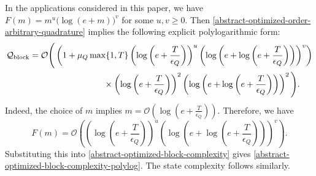 \documentclass[10pt,reqno]{article}
\numberwithin{equation}{section}
\theoremstyle{plain}
\theoremstyle{definition}
\begin{document}
In the applications considered in this paper, we have \(F(m)=m^u\bigl(\log(e+m)\bigr)^v\) for some \(u,v\geq0\). Then \cref{abstract-optimized-order-arbitrary-quadrature} implies the following explicit polylogarithmic form:
\begin{align}\label{abstract-optimized-block-complexity-polylog}
\mathcal Q_{\operatorname{block}} = \mathcal O\Bigg( &\left( 1+ \mu_Q\max\{1,T\} \left(\log\left(e+\frac{T}{\epsilon_Q}\right)\right)^u \left( \log\left(e+\log\left(e+\frac{T}{\epsilon_Q}\right)\right) \right)^v \right) \notag\\ &\hspace{2cm}\times \left(\log\left(e+\frac{T}{\epsilon_Q}\right)\right)^2 \left( \log\left(e+\log\left(e+\frac{T}{\epsilon_Q}\right)\right) \right)^2 \Bigg).
\end{align}
Indeed, the choice of \(m\) implies 
$m = \mathcal O\left( \log\left(e+\frac{T}{\epsilon_Q}\right) \right)$. Therefore, we have
\begin{equation}
F(m) = \mathcal O\left( \left(\log\left(e+\frac{T}{\epsilon_Q}\right)\right)^u \left( \log\left(e+\log\left(e+\frac{T}{\epsilon_Q}\right)\right) \right)^v \right).
\end{equation}
Substituting this into \cref{abstract-optimized-block-complexity} gives \cref{abstract-optimized-block-complexity-polylog}. The state complexity follows similarly.
\end{document}
